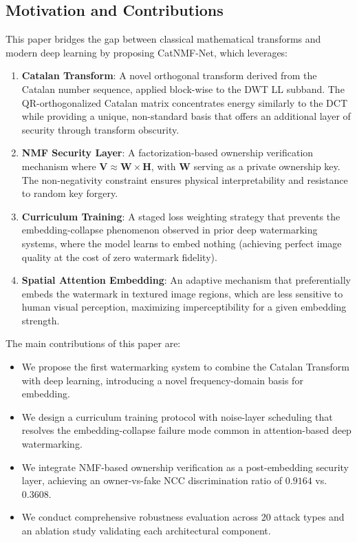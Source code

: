 \documentclass[journal]{IEEEtran}
\begin{document}
\subsection{Motivation and Contributions}

This paper bridges the gap between classical mathematical transforms and
modern deep learning by proposing CatNMF-Net, which leverages:

\begin{enumerate}
  \item \textbf{Catalan Transform}: A novel orthogonal transform derived
  from the Catalan number sequence, applied block-wise to the DWT LL
  subband. The QR-orthogonalized Catalan matrix concentrates energy
  similarly to the DCT while providing a unique, non-standard basis that
  offers an additional layer of security through transform obscurity.

  \item \textbf{NMF Security Layer}: A factorization-based ownership
  verification mechanism where $\mathbf{V} \approx \mathbf{W} \times
  \mathbf{H}$, with $\mathbf{W}$ serving as a private ownership key. The
  non-negativity constraint ensures physical interpretability and
  resistance to random key forgery.

  \item \textbf{Curriculum Training}: A staged loss weighting strategy
  that prevents the embedding-collapse phenomenon observed in prior
  deep watermarking systems, where the model learns to embed nothing
  (achieving perfect image quality at the cost of zero watermark
  fidelity).

  \item \textbf{Spatial Attention Embedding}: An adaptive mechanism that
  preferentially embeds the watermark in textured image regions, which
  are less sensitive to human visual perception, maximizing imperceptibility
  for a given embedding strength.
\end{enumerate}

The main contributions of this paper are:
\begin{itemize}
  \item We propose the first watermarking system to combine the Catalan
  Transform with deep learning, introducing a novel frequency-domain
  basis for embedding.
  \item We design a curriculum training protocol with noise-layer
  scheduling that resolves the embedding-collapse failure mode
  common in attention-based deep watermarking.
  \item We integrate NMF-based ownership verification as a post-embedding
  security layer, achieving an owner-vs-fake NCC discrimination ratio
  of $0.9164$ vs. $0.3608$.
  \item We conduct comprehensive robustness evaluation across 20 attack
  types and an ablation study validating each architectural component.
\end{itemize}
\end{document}
